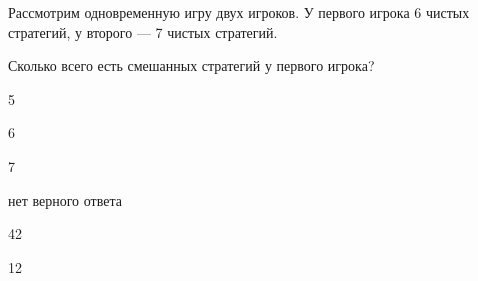 
\begin{question}
Рассмотрим одновременную игру двух игроков. У первого игрока 6 чистых
стратегий, у второго --- 7 чистых стратегий.

Сколько всего есть смешанных стратегий у первого игрока?
\begin{answerlist}
  \item 5
  \item 6
  \item 7
  \item нет верного ответа
  \item 42
  \item 12
\end{answerlist}
\end{question}


